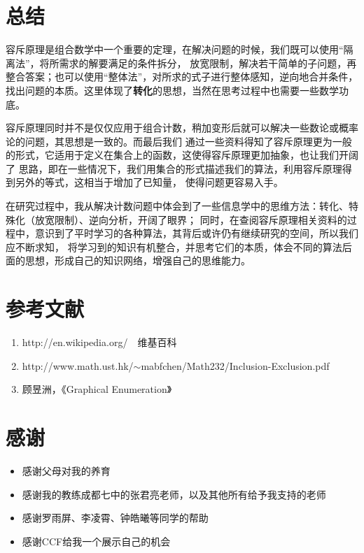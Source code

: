 \documentclass{noithesis}
\theoremstyle{plain}      \newtheorem{theorem}{定理}[subsection]
\theoremstyle{definition} \newtheorem{problem}{问题}[subsection]
\begin{document}
\section{总结}

容斥原理是组合数学中一个重要的定理，在解决问题的时候，我们既可以使用“隔离法”，将所需求的解要满足的条件拆分，
放宽限制，解决若干简单的子问题，再整合答案；也可以使用“整体法”，对所求的式子进行整体感知，逆向地合并条件，
找出问题的本质。这里体现了\textbf{转化}的思想，当然在思考过程中也需要一些数学功底。 \par

容斥原理同时并不是仅仅应用于组合计数，稍加变形后就可以解决一些数论或概率论的问题，其思想是一致的。而最后我们
通过一些资料得知了容斥原理更为一般的形式，它适用于定义在集合上的函数，这使得容斥原理更加抽象，也让我们开阔了
思路，即在一些情况下，我们用集合的形式描述我们的算法，利用容斥原理得到另外的等式，这相当于增加了已知量，
使得问题更容易入手。 \par

在研究过程中，我从解决计数问题中体会到了一些信息学中的思维方法：转化、特殊化（放宽限制）、逆向分析，开阔了眼界；
同时，在查阅容斥原理相关资料的过程中，意识到了平时学习的各种算法，其背后或许仍有继续研究的空间，所以我们应不断求知，
将学习到的知识有机整合，并思考它们的本质，体会不同的算法后面的思想，形成自己的知识网络，增强自己的思维能力。

\section*{参考文献}

\begin{enumerate}
\item http://en.wikipedia.org/~~维基百科
\item http://www.math.ust.hk/$\sim$mabfchen/Math232/Inclusion-Exclusion.pdf
\item 顾昱洲，《Graphical Enumeration》
\end{enumerate}

\section*{感谢}

\begin{itemize}
\item 感谢父母对我的养育
\item 感谢我的教练成都七中的张君亮老师，以及其他所有给予我支持的老师
\item 感谢罗雨屏、李凌霄、钟皓曦等同学的帮助
\item 感谢CCF给我一个展示自己的机会
\end{itemize}

\end{document}

